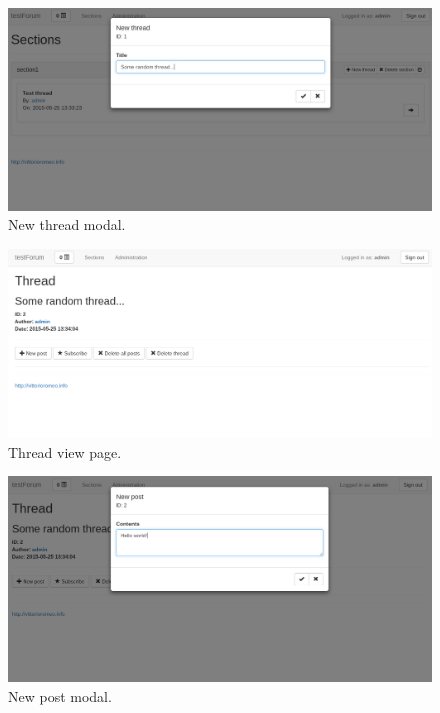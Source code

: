 \documentclass[12pt]{report}
\begin{document}
            \begin{figure}[!htb]
            \caption{New thread modal.}
            \centering
            \includegraphics[width=1\textwidth]{u/3}
            \end{figure}

            \begin{figure}[!htb]
            \caption{Thread view page.}
            \centering
            \includegraphics[width=1\textwidth]{u/4}
            \end{figure}

            \begin{figure}[!htb]
            \caption{New post modal.}
            \centering
            \includegraphics[width=1\textwidth]{u/5}
            \end{figure}
\end{document}
